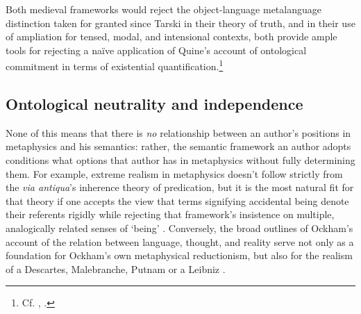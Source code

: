 \documentclass[]{article}
\begin{document}
Both medieval frameworks would reject the object-language metalanguage distinction taken for granted since Tarski in their theory of truth, 
and 
in their use of ampliation for tensed, modal, and intensional contexts,
both provide ample tools for rejecting a na\"{i}ve application of Quine's account of ontological commitment in terms of existential quantification.\footnote{Cf. \autocite{Klima2004}, 
\autocite[171-174]{Klima2009}.}

\subsection{Ontological neutrality and independence}
None of this means that there is \emph{no} relationship between an author's positions in metaphysics and his semantics: 
rather, 
the semantic framework an author adopts conditions what options that author has in metaphysics without fully determining them. 
For example, extreme realism in metaphysics doesn't follow strictly from the \emph{via antiqua}'s inherence theory of predication, 
but it is the most natural fit for that theory 
if one accepts the view that terms signifying accidental being denote their referents rigidly 
while rejecting that framework's insistence on multiple, analogically related senses of `being' \autocite[125]{Klima1999}. 
Conversely, the broad outlines of Ockham's account of the relation between language, thought, and reality 
serve not only as a foundation for Ockham's own metaphysical reductionism, 
but also for the realism of a Descartes, Malebranche, Putnam or a Leibniz \autocite{Klima1991}. 
\end{document}
